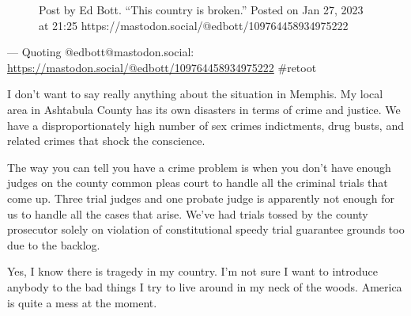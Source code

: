 \begin{figure}
\centering
{}
\caption{Post by Ed Bott. ``This country is broken.'' Posted on Jan 27,
2023 at 21:25 https://mastodon.social/@edbott/109764458934975222}
\end{figure}

--- Quoting @edbott@mastodon.social:
\url{https://mastodon.social/@edbott/109764458934975222} \#retoot

I don't want to say really anything about the situation in Memphis. My
local area in Ashtabula County has its own disasters in terms of crime
and justice. We have a disproportionately high number of sex crimes
indictments, drug busts, and related crimes that shock the conscience.

The way you can tell you have a crime problem is when you don't have
enough judges on the county common pleas court to handle all the
criminal trials that come up. Three trial judges and one probate judge
is apparently not enough for us to handle all the cases that arise.
We've had trials tossed by the county prosecutor solely on violation of
constitutional speedy trial guarantee grounds too due to the backlog.

Yes, I know there is tragedy in my country. I'm not sure I want to
introduce anybody to the bad things I try to live around in my neck of
the woods. America is quite a mess at the moment.
